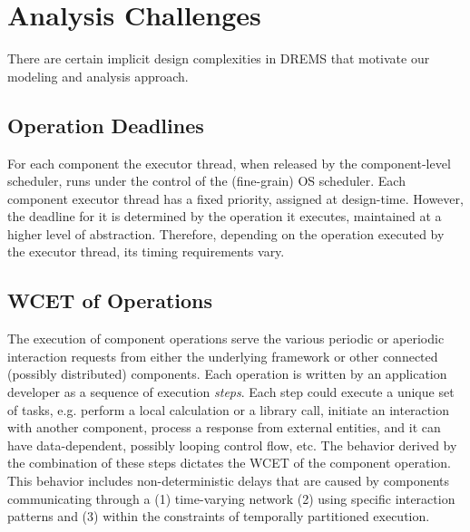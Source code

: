 \section{Analysis Challenges}
\label{sec:Challenges}

There are certain implicit design complexities in DREMS that motivate our modeling and analysis approach.
\subsection{Operation Deadlines}
\label{subsec:Operation_Deadlines}
For each component the executor thread, when released by the component-level scheduler, runs under the control of the (fine-grain) OS scheduler. Each component executor thread has a fixed priority, assigned at design-time. However, the deadline for it is determined by the operation it executes, maintained at a higher level of abstraction. Therefore, depending on the operation executed by the executor thread, its timing requirements vary.

\subsection{WCET of Operations}
The execution of component operations serve the various periodic or aperiodic interaction requests from either the underlying framework or other connected (possibly distributed) components. Each operation is written by an application developer as a sequence of execution \emph{steps}. Each step could execute a unique set of tasks, e.g. perform a local calculation or a library call, initiate an interaction with another component, process a response from external entities, and it can have data-dependent, possibly looping control flow, etc. The behavior derived by the combination of these steps dictates the WCET of the component operation. This behavior includes non-deterministic delays that are caused by components communicating through a (1) time-varying network (2) using specific interaction patterns and (3) within the constraints of temporally partitioned execution. 


